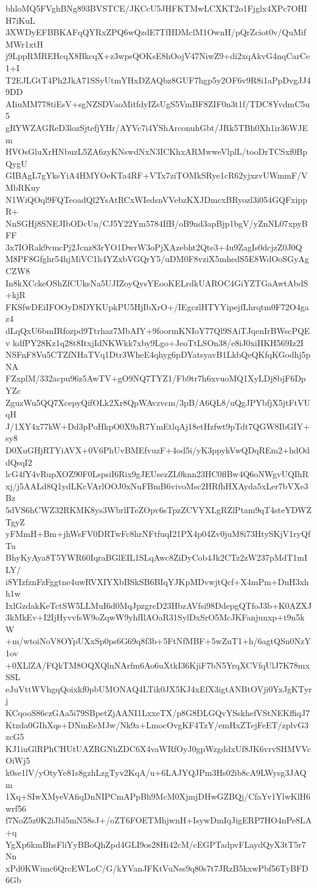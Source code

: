 bhloMQ5FVghBNg893BVSTCE/JKCcU5JHFKTMwLCXKT2o1Fjglx4XPc7OHIH7iKuL
3XWDyEFBBKAFqQYRxZPQ6wQzdE7TfHDMclM1OwnH/pQrZciot0v/QuMifMWr1xtH
j9LppRMREHcqX8BkcqX+z3wpsQOKsE8hOojV47NiwZ9+di2xqAkvG4nqCarCe1+I
T2EJLGtT4Ph2JkA71SSyUtmYHxDZAQbz8GUF7hgp5y2OF6v9R8i1aPpDvgJJ49DD
AIiuMM778tiEsV+sgNZSDVaoMitfdyIZsUgS5VmBF8ZIF0n3t1f/TDC8YvdmC5u5
gRYWZAGReD3lozSjtefjYHr/AYVc7i4YShArconuhGbt/JRk5TBh0Xh1ir36WJEm
HVOsGluXrHNbuzL5ZA6zyKNswdNxN3ICKhxARMwweVlplL/tooDrTCSxf0BpQygU
GIBAgL7gYksYiA4HMYOeKTa4RF+VTx7ziTOMkSRye1cR62yjxzvUWmmF/VMbRKuy
N1WiQOql9FQTeoadQl2YsAtRCxWIedsnVVebzKXJDmcxBRyozl3i054GQFxippR+
NnSGHj8SNEJIbODcUn/CJ5Y22Ym5784IfB/oB9nd3apBjp1bgV/yZnNL07xpyBFF
3x7IORak9vmcPj2Jcnz83rYO1DwrW3oPjXAzebht2Qte3+4u9ZagIs0dcjzZ0J0Q
M8PF8Gfghr54hjMiVC1h4YZxbVGQrY5/uDM0F8vziX5mhedS5E8WdOoSGyAgCZW8
In8kXCckeOShZfCUksNa5UJIZoyQysYEooKELrdkUAROC4GiYZTGaAwtAbdS+kjR
FKSfwDEiIFOOyD8DYKUpkPU5HjIbXrO+/IEgczlHTYYipejfLhrqtm0F72O4gaz4
dLqQxU6bmIRfozpd9Ttrhaz7MbAIY+9foormKNIoY77Ql9SAiTJqenIrBWscPQEv
kdfPY28Kz1q28t8ItxjIdNKWkk7xby9Lgo+JeoTtLSOn38/e8iJ0xiHKH569Iz2I
NSFnF8Vu5CTZfNHaTVq1Dtr3WheE4qhyg6pDYatsyavB1LkbQeQKfqKGodhj5pNA
FZxplM/332acpu96z5AwTV+gO9NQ7TYZ1/Fb9tr7h6xvuoMQ1XyLDj8bjF6DpYZc
ZguzWu5QQ7XcepyQifOLk2Xr8QpWAvzvcm/3pB/A6QL8/uQgJPYbfjX5jtFtVUqH
J/1XY4x77kW+Dd3pPoHkpO0X9aR7YmEtlqAj18etHzfwt9pTdt7QGW8IbGIY+sy8
D0XuGHjRTYiAVX+0V6PhUvBMEfvuzF+4od5i/yK3ppykVwQDqREm2+hdOddQsqI2
lcG4fY4vRupXOZ90F0LspsiI6Rix9gJEUsezZL0knn23HC0flBw4Q6oNWgvUQIhR
xj/j5AALd8Q1ydLKcVArlOOJ0xNuFBmB6vivoMsc2HRfhHXAyda5xLer7bVXe3Bz
5dVS6hCWZ32RKMK8ys3WbrlITeZOpv6sTpzZCVYXLgRZlPtam9qT4steYDWZTgyZ
yFMmH+Bm+jhWsFV0DRTwFc8hrNFtfuqI21PX4p04Zv0juM8i73HtySKjV1ryQfTu
BhyKyAya8T5YWR60IqraBGlEIL1SLqAwc8ZiDyCob4Jk2CTz2zW237pMdT1mILY/
i8YIzfznFzFggtne4uwRVXIYXbBSkSB6BIqYJKpMDvwjtQcf+X4mPm+DnH3xhh1w
IxlGzdakKeTctSW5LLMuI6d0MqJpzgrcD23HbzAVfsi98DdepgQTfoJ3b+K0AZXJ
3kMkEv+I2IjHyvvfsW9oZqwW9yhfIlAOaR31SylDxSrO5McJKFanjunxp+t9n5kW
+m/wtoiNoV8OYpUXxSp0ps6G69q8f3b+5FtNfMBF+5wZuT1+h/6agtQSn0NzY1ov
+0XLlZA/FQkTM8OQXQlnNArfm6Ao6uXtkI36KjiF7bN5YrqXCVfqUlJ7K78mxSSL
eJuVttWVhgqQoixkf0pbUMONAQ4LTik0JX5KJ4xEfX3igtANBtOVji0YxJgKTyrj
KCqooS86czGAa5i79SBpetZjAANI1LxxeTX/p8G8DLGQvYSskhefVStNEKffiqJ7
Ktzda0GIhXqs+DNmEeMJw/Nk9a+LmocOvgKF4TzY/emHxZTejFeET/zplvG3zcG5
KJ1iuGlRPhCHUtUAZRGNhZDC6X4vaWRfOyJ0gpWzgddxUf8JK6vrvSHMVVcOiWj5
k0se1lV/yOtyYe81s8gzhLzgTyv2KqA/u+6LAJYQJPm3Hs02ib8cA9LWysg3JAQm
1Xq+SIwXMyeVAfiqDnNIPCmAPpBh9McM0XjmjDHwGZBQj/CfaYv1YlwKlH6wrf56
f7NoZ5z0K2iJbl5mN58sJ+/oZT6FOETMhjwnH+IsywDmIqJigERP7HO4nPe8LA+q
YgXp6kmBhsFliYyBBoQhZpd4GLI9os28Hi42cM/cEGPTadpvFLaydQyX3tT5r7Nn
xPd0KWimc6QrcEWLoC/G/kYVanJFKtVuNss9q80s7t7JRzB5kxwPbf56TyBFD6Gb
